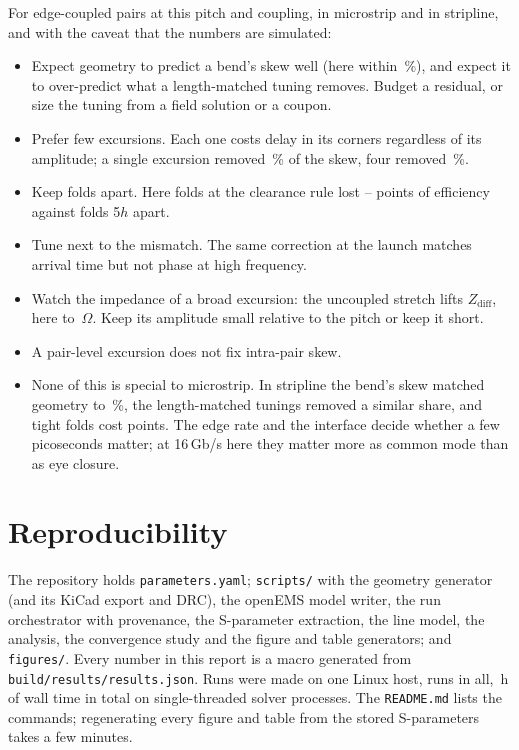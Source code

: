 \documentclass[10pt,twocolumn]{article}
\begin{document}
For edge-coupled pairs at this pitch and coupling, in microstrip and in stripline, and with the caveat that the
numbers are simulated:
\begin{itemize}\itemsep 1pt
\item Expect geometry to predict a bend's skew well (here within \BendErrPct\,\%), and expect it to over-predict what a
length-matched tuning removes. Budget a residual, or size the tuning from a field solution or a coupon.
\item Prefer few excursions. Each one costs delay in its corners regardless of its amplitude; a single excursion
removed \RemovedPctF\,\% of the skew, four removed \RemovedPctD\,\%.
\item Keep folds apart. Here folds at the clearance rule lost \FoldPenMin--\FoldPenMax{} points of efficiency
against folds
5$h$ apart.
\item Tune next to the mismatch. The same correction at the launch matches arrival time but not phase at high
frequency.
\item Watch the impedance of a broad excursion: the uncoupled stretch lifts $Z_\mathrm{diff}$, here to
\ZmaxF\,$\Omega$. Keep its amplitude small relative to the pitch or keep it short.
\item A pair-level excursion does not fix intra-pair skew.
\item None of this is special to microstrip. In stripline the bend's skew matched geometry to \BendErrPctSl\,\%,
the length-matched tunings removed a similar share, and tight folds cost \FoldPenaltySl{} points. The edge rate and the interface decide whether a few
picoseconds matter; at 16\,Gb/s here they matter more as common mode than as eye closure.
\end{itemize}

\section{Reproducibility}
\label{sec:repro}

The repository holds \texttt{parameters.yaml}; \texttt{scripts/} with the geometry generator (and its KiCad
export and DRC), the openEMS model writer, the run orchestrator with provenance, the S-parameter extraction, the
line model, the analysis, the convergence study and the figure and table generators; and \texttt{figures/}. Every
number in this report is a macro generated from \texttt{build/results/results.json}. Runs were made on one Linux
host, \RunCount{} runs in all, \RunHours\,h of wall time in total on single-threaded solver processes. The
\texttt{README.md} lists the commands; regenerating every figure and table from the stored S-parameters takes a
few minutes.
\end{document}
